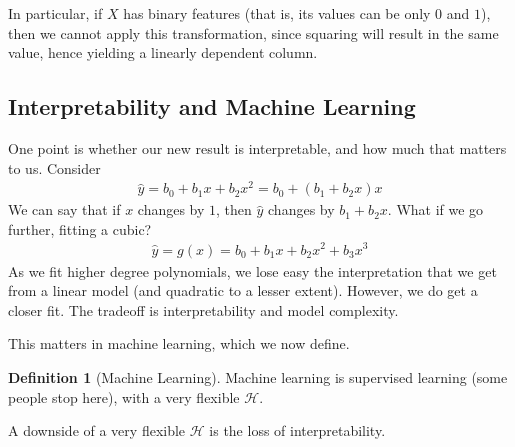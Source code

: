 \documentclass[12pt, a4paper]{article}
\theoremstyle{definition}
\newtheorem*{definition}{Definition}
\begin{document}
	In particular, if $X$ has binary features (that is, its values can be only $0$
	and $1$), then we cannot apply this transformation, since squaring will result
	in the same value, hence yielding a linearly dependent column.
	\subsection*{Interpretability and Machine Learning}
	One point is whether our new result is interpretable, and how much that
	matters to us. Consider
	\begin{align*}
		\hat{y} = b_0 + b_1x + b_2x^2 = b_0 + (b_1 + b_2x)x
	\end{align*}
	We can say that if $x$ changes by $1$, then $\hat{y}$ changes by $b_1+b_2x$.
	What if we go further, fitting a cubic?
	\begin{align*}
		\hat{y} = g(x) = b_0 + b_1x + b_2x^2 + b_3x^3
	\end{align*}
	As we fit higher degree polynomials, we lose easy the interpretation
	that we get from a linear model (and quadratic to a lesser extent).
	However, we do get a closer fit. The tradeoff is interpretability and
	model complexity.
	
	This matters in machine learning, which we now define.
	\begin{tcolorbox}[breakable]
		\begin{definition}[Machine Learning]
			Machine learning is supervised learning (some people stop here),
			with a very flexible $\mathcal{H}$.
		\end{definition}
	\end{tcolorbox}
	A downside of a very flexible $\mathcal{H}$ is the loss of interpretability.
\end{document}
